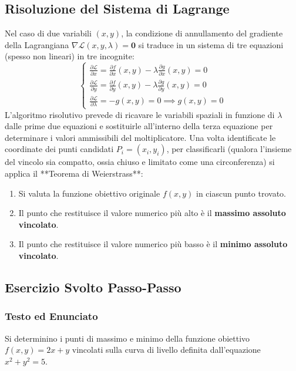 \subsection{Risoluzione del Sistema di Lagrange}
Nel caso di due variabili $(x,y)$, la condizione di annullamento del gradiente della Lagrangiana $\nabla \mathcal{L}(x,y,\lambda) = \mathbf{0}$ si traduce in un sistema di tre equazioni (spesso non lineari) in tre incognite:
\[
\begin{cases}
\frac{\partial \mathcal{L}}{\partial x} = \frac{\partial f}{\partial x}(x,y) - \lambda \frac{\partial g}{\partial x}(x,y) = 0 \\[1.5ex]
\frac{\partial \mathcal{L}}{\partial y} = \frac{\partial f}{\partial y}(x,y) - \lambda \frac{\partial g}{\partial y}(x,y) = 0 \\[1.5ex]
\frac{\partial \mathcal{L}}{\partial \lambda} = -g(x,y) = 0 \implies g(x,y) = 0
\end{cases}
\]
L'algoritmo risolutivo prevede di ricavare le variabili spaziali in funzione di $\lambda$ dalle prime due equazioni e sostituirle all'interno della terza equazione per determinare i valori ammissibili del moltiplicatore. Una volta identificate le coordinate dei punti candidati $P_i = (x_i, y_i)$, per classificarli (qualora l'insieme del vincolo sia compatto, ossia chiuso e limitato come una circonferenza) si applica il **Teorema di Weierstrass**:
\begin{enumerate}
    \item Si valuta la funzione obiettivo originale $f(x,y)$ in ciascun punto trovato.
    \item Il punto che restituisce il valore numerico più alto è il \textbf{massimo assoluto vincolato}.
    \item Il punto che restituisce il valore numerico più basso è il \textbf{minimo assoluto vincolato}.
\end{enumerate}

\subsection{Esercizio Svolto Passo-Passo}

\subsubsection{Testo ed Enunciato}
Si determinino i punti di massimo e minimo della funzione obiettivo $f(x,y) = 2x + y$ vincolati sulla curva di livello definita dall'equazione $x^2 + y^2 = 5$.

